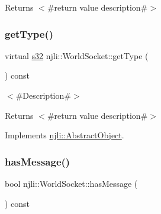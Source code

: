 \begin{DoxyReturn}{Returns}
$<$\#return value description\#$>$ 
\end{DoxyReturn}
\mbox{\label{classnjli_1_1_world_socket_a497c7bba3a7001fb1ad2f8c98768d9eb}} 
\subsubsection{\texorpdfstring{get\+Type()}{getType()}}
{\footnotesize\ttfamily virtual \mbox{\hyperlink{_util_8h_aa62c75d314a0d1f37f79c4b73b2292e2}{s32}} njli\+::\+World\+Socket\+::get\+Type (\begin{DoxyParamCaption}{ }\end{DoxyParamCaption}) const\hspace{0.3cm}{\ttfamily [virtual]}}

$<$\#\+Description\#$>$

\begin{DoxyReturn}{Returns}
$<$\#return value description\#$>$ 
\end{DoxyReturn}


Implements \mbox{\hyperlink{classnjli_1_1_abstract_object_a08dcf202a47f0782813b8bc98c659e78}{njli\+::\+Abstract\+Object}}.

\mbox{\label{classnjli_1_1_world_socket_ae4161c8d9db7f9b53dd855c0313b5d18}} 
\subsubsection{\texorpdfstring{has\+Message()}{hasMessage()}}
{\footnotesize\ttfamily bool njli\+::\+World\+Socket\+::has\+Message (\begin{DoxyParamCaption}{ }\end{DoxyParamCaption}) const}

\mbox{\label{classnjli_1_1_world_socket_ae3c8b6487d5edb322a93bf9204c287a2}} 
